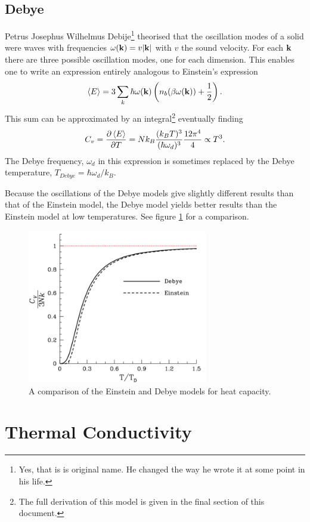 \documentclass[11pt]{amsart}
\begin{document}
\subsection{Debye}
Petrus Josephus Wilhelmus Debije\footnote{Yes, that is is original name. He changed the way he wrote it at some point in his life.} theorised that the oscillation modes of a solid were waves with frequencies $\omega(\vb{k}) = v\abs{\vb{k}}$ with $v$ the sound velocity. For each $\vb{k}$ there are three possible oscillation modes, one for each dimension. This enables one to write an expression entirely analogous to Einstein's expression
\begin{equation}
\label{eq:debyestart}
\ev{E} = 3\sum_k\hbar\omega(\vb{k})\left(n_b(\beta\omega(\vb{k}))+\frac{1}{2}\right).
\end{equation}
This sum can be approximated by an integral\footnote{The full derivation of this model is given in the final section of this document.} eventually finding
\begin{equation}
C_v = \frac{\partial\ev{E}}{\partial T} = Nk_B \frac{(k_B T)^3}{(\hbar\omega_d)^3}\frac{12\pi^4}{4} \propto T^3.
\end{equation}
The Debye frequency, $\omega_d$ in this expression is sometimes replaced by the Debye temperature, $T_{Debye} = \hbar\omega_d/k_B$.

Because the oscillations of the Debye models give slightly different results than that of the Einstein model, the Debye model yields better results than the Einstein model at low temperatures. See figure \ref{fig:debyeVSEinstein} for a comparison.

\begin{figure}
\centering
	\includegraphics[width = 0.7\textwidth]{DebyeVSEinstein.jpg}
	\caption{A comparison of the Einstein and Debye models for heat capacity.}
	\label{fig:debyeVSEinstein}
\end{figure}

\setcounter{section}{5}
\section{Thermal Conductivity}
\end{document}
